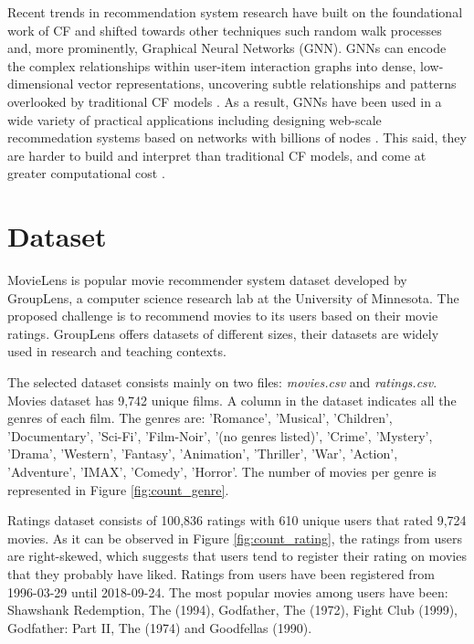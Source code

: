\documentclass[12pt]{article}
\numberwithin{equation}{section}
\begin{document}
Recent trends in recommendation system research have built on the foundational work of CF and shifted towards other techniques such random walk processes \cite{prob_s} and, more prominently, Graphical Neural Networks (GNN). GNNs can encode the complex relationships within user-item interaction graphs into dense, low-dimensional vector representations,  uncovering subtle relationships and patterns overlooked by traditional CF models . As a result, GNNs have been used in a wide variety of practical applications including designing web-scale recommedation systems based on networks with billions of nodes \cite{GNNwebscale}. This said, they are harder to build and interpret than traditional CF models, and come at greater computational cost \cite{collab_f}. 

\section{Dataset}

MovieLens is popular movie recommender system dataset developed by GroupLens, a computer science research lab at the University of Minnesota. The proposed challenge is to recommend movies to its users based on their movie ratings. GroupLens offers datasets of different sizes, their datasets are widely used in research and teaching contexts.

The selected dataset consists mainly on two files: \textit{movies.csv} and  \textit{ratings.csv}. Movies dataset has 9,742 unique films. A column in the dataset indicates all the genres of each film. The genres are: 'Romance', 'Musical', 'Children', 'Documentary', 'Sci-Fi', 'Film-Noir', '(no genres listed)', 'Crime', 'Mystery', 'Drama', 'Western', 'Fantasy', 'Animation', 'Thriller', 'War', 'Action', 'Adventure', 'IMAX', 'Comedy', 'Horror'. The number of movies per genre is represented in Figure \ref{fig:count_genre}.

Ratings dataset consists of 100,836 ratings with 610 unique users that rated 9,724 movies. As it can be observed in Figure \ref{fig:count_rating}, the ratings from users are right-skewed, which suggests that users tend to register their rating on movies that they probably have liked. Ratings from users have been registered from 1996-03-29 until 2018-09-24. The most popular movies among users have been: Shawshank Redemption, The (1994), Godfather, The (1972), Fight Club (1999), Godfather: Part II, The (1974) and Goodfellas (1990).
\end{document}

